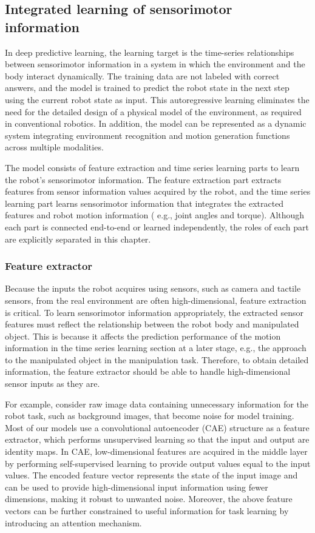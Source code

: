 \subsection{Integrated learning of sensorimotor information}
In deep predictive learning, the learning target is the time-series relationships between sensorimotor information in a system in which the environment and the body interact dynamically. The training data are not labeled with correct answers, and the model is trained to predict the robot state in the next step using the current robot state as input. This autoregressive learning eliminates the need for the detailed design of a physical model of the environment, as required in conventional robotics. In addition, the model can be represented as a dynamic system integrating environment recognition and motion generation functions across multiple modalities.

The model consists of feature extraction and time series learning parts to learn the robot's sensorimotor information. The feature extraction part extracts features from sensor information values acquired by the robot, and the time series learning part learns sensorimotor information that integrates the extracted features and robot motion information ( e.g., joint angles and torque). Although each part is connected end-to-end or learned independently, the roles of each part are explicitly separated in this chapter.


\subsubsection{Feature extractor}
Because the inputs the robot acquires using sensors, such as camera and tactile sensors, from the real environment are often high-dimensional, feature extraction is critical. To learn sensorimotor information appropriately, the extracted sensor features must reflect the relationship between the robot body and manipulated object. This is because it affects the prediction performance of the motion information in the time series learning section at a later stage, e.g., the approach to the manipulated object in the manipulation task. Therefore, to obtain detailed information, the feature extractor should be able to handle high-dimensional sensor inputs as they are. 

For example, consider raw image data containing unnecessary information for the robot task, such as background images, that become noise for model training. Most of our models use a convolutional autoencoder (CAE) structure as a feature extractor, which performs unsupervised learning so that the input and output are identity maps. In CAE, low-dimensional features are acquired in the middle layer by performing self-supervised learning to provide output values equal to the input values. The encoded feature vector represents the state of the input image and can be used to provide high-dimensional input information using fewer dimensions, making it robust to unwanted noise. Moreover, the above feature vectors can be further constrained to useful information for task learning by introducing an attention mechanism\cite{ichiwara2022contact, ito2022integrated}.


